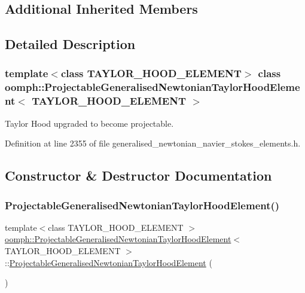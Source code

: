 \subsection*{Additional Inherited Members}


\subsection{Detailed Description}
\subsubsection*{template$<$class T\+A\+Y\+L\+O\+R\+\_\+\+H\+O\+O\+D\+\_\+\+E\+L\+E\+M\+E\+NT$>$\newline
class oomph\+::\+Projectable\+Generalised\+Newtonian\+Taylor\+Hood\+Element$<$ T\+A\+Y\+L\+O\+R\+\_\+\+H\+O\+O\+D\+\_\+\+E\+L\+E\+M\+E\+N\+T $>$}

Taylor Hood upgraded to become projectable. 

Definition at line 2355 of file generalised\+\_\+newtonian\+\_\+navier\+\_\+stokes\+\_\+elements.\+h.



\subsection{Constructor \& Destructor Documentation}
\mbox{\label{classoomph_1_1ProjectableGeneralisedNewtonianTaylorHoodElement_a84e5e27501f7bd74aeb2ed595b674884}} 
\subsubsection{\texorpdfstring{Projectable\+Generalised\+Newtonian\+Taylor\+Hood\+Element()}{ProjectableGeneralisedNewtonianTaylorHoodElement()}}
{\footnotesize\ttfamily template$<$class T\+A\+Y\+L\+O\+R\+\_\+\+H\+O\+O\+D\+\_\+\+E\+L\+E\+M\+E\+NT $>$ \\
\hyperlink{classoomph_1_1ProjectableGeneralisedNewtonianTaylorHoodElement}{oomph\+::\+Projectable\+Generalised\+Newtonian\+Taylor\+Hood\+Element}$<$ T\+A\+Y\+L\+O\+R\+\_\+\+H\+O\+O\+D\+\_\+\+E\+L\+E\+M\+E\+NT $>$\+::\hyperlink{classoomph_1_1ProjectableGeneralisedNewtonianTaylorHoodElement}{Projectable\+Generalised\+Newtonian\+Taylor\+Hood\+Element} (\begin{DoxyParamCaption}{ }\end{DoxyParamCaption})\hspace{0.3cm}{\ttfamily [inline]}}



